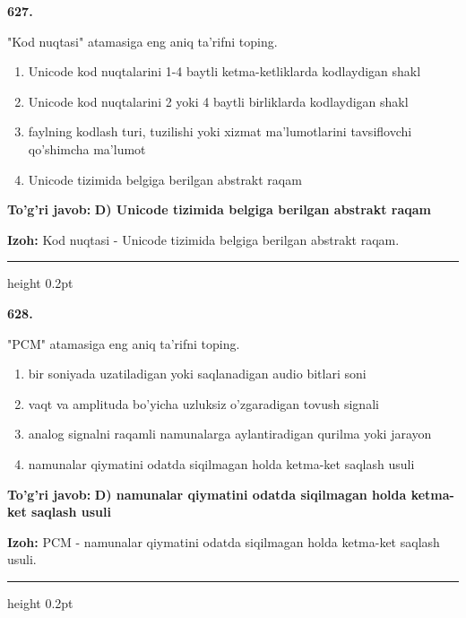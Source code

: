 \documentclass[10pt,a4paper,oneside]{article}
\begin{document}
\noindent\textbf{\color{ink}627.}
\par
"Kod nuqtasi" atamasiga eng aniq ta'rifni toping.
\begin{enumerate}[label=\Alph*),leftmargin=9mm]
\item Unicode kod nuqtalarini 1-4 baytli ketma-ketliklarda kodlaydigan shakl
\item Unicode kod nuqtalarini 2 yoki 4 baytli birliklarda kodlaydigan shakl
\item faylning kodlash turi, tuzilishi yoki xizmat ma'lumotlarini tavsiflovchi qo'shimcha ma'lumot
\item Unicode tizimida belgiga berilgan abstrakt raqam
\end{enumerate}
\begin{tcolorbox}[enhanced,breakable,colback=teal!4,colframe=teal!50!black,boxrule=0.5pt,arc=1.1mm,left=3mm,right=3mm,top=1.7mm,bottom=1.7mm,before skip=2mm,after skip=2mm]
\textbf{\color{teal}To'g'ri javob:} \textbf{D) Unicode tizimida belgiga berilgan abstrakt raqam}
\par\smallskip
\textbf{Izoh:} Kod nuqtasi - Unicode tizimida belgiga berilgan abstrakt raqam.
\end{tcolorbox}
\vspace{2mm}\hrule height 0.2pt \vspace{3mm}

\noindent\textbf{\color{ink}628.}
\par
"PCM" atamasiga eng aniq ta'rifni toping.
\begin{enumerate}[label=\Alph*),leftmargin=9mm]
\item bir soniyada uzatiladigan yoki saqlanadigan audio bitlari soni
\item vaqt va amplituda bo'yicha uzluksiz o'zgaradigan tovush signali
\item analog signalni raqamli namunalarga aylantiradigan qurilma yoki jarayon
\item namunalar qiymatini odatda siqilmagan holda ketma-ket saqlash usuli
\end{enumerate}
\begin{tcolorbox}[enhanced,breakable,colback=teal!4,colframe=teal!50!black,boxrule=0.5pt,arc=1.1mm,left=3mm,right=3mm,top=1.7mm,bottom=1.7mm,before skip=2mm,after skip=2mm]
\textbf{\color{teal}To'g'ri javob:} \textbf{D) namunalar qiymatini odatda siqilmagan holda ketma-ket saqlash usuli}
\par\smallskip
\textbf{Izoh:} PCM - namunalar qiymatini odatda siqilmagan holda ketma-ket saqlash usuli.
\end{tcolorbox}
\vspace{2mm}\hrule height 0.2pt \vspace{3mm}
\end{document}
